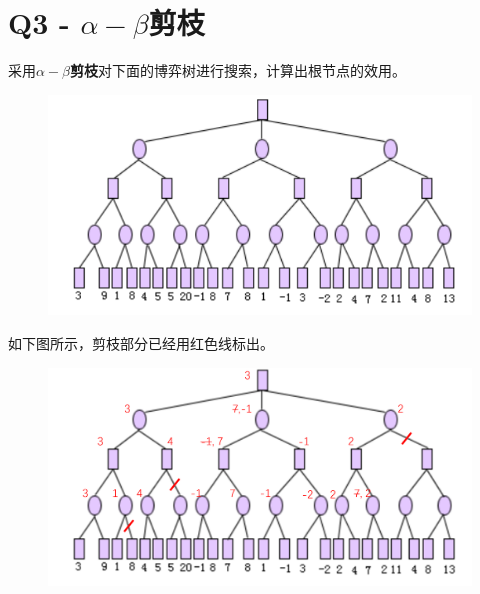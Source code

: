 \documentclass[a4paper, 11pt]{article}
\begin{document}
\section{Q3 - $\alpha-\beta$剪枝}
\begin{question}
采用\textbf{$\alpha-\beta$剪枝}对下面的博弈树进行搜索，计算出根节点的效用。
\begin{figure}[H]
\centering
\includegraphics[width=\linewidth]{fig/Q3.png}
\end{figure}
\end{question}
\begin{answer}
如下图所示，剪枝部分已经用红色线标出。
\begin{figure}[H]
\centering
\includegraphics[width=\linewidth]{fig/A3.png}
\end{figure}
\end{answer}
\end{document}
